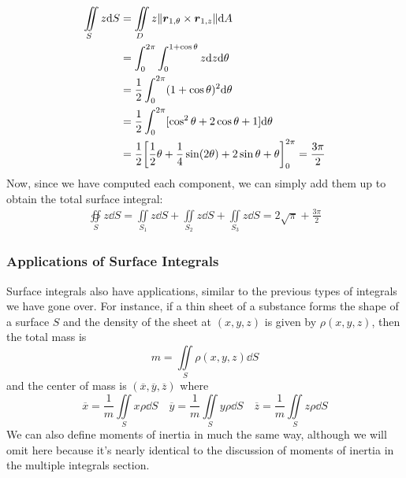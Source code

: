 \begin{example}
\begin{align*}
        \iint\limits_S z\dd S &= \iint\limits_D z\norm{\vec r_{1,\theta}\times\vec r_{1,z}}\dd A \\
        &= \int_0^{2\pi}\int_0^{1+\cos\theta}z\dd z\dd \theta \\
        &= \frac{1}{2}\int_0^{2\pi}(1+\cos\theta)^2\dd \theta \\
        &= \frac{1}{2}\int_0^{2\pi}[\cos^2\theta + 2\cos\theta + 1]\dd \theta \\
        &= \frac{1}{2}\bqty{\frac{1}{2}\theta + \frac{1}{4}\sin(2\theta)+ 2\sin\theta + \theta}_0^{2\pi} = \frac{3\pi}{2} \\
    \end{align*}
    Now, since we have computed each component, we can simply add them up to obtain the total surface integral:
    \begin{align*}
        \oiint\limits_S z\dd S  =\iint\limits_{S_1} z\dd S+\iint\limits_{S_2} z\dd S+\iint\limits_{S_3} z\dd S = 2\sqrt{\pi}+\frac{3\pi}{2}
    \end{align*}
\end{example}
\subsubsection{Applications of Surface Integrals}
Surface integrals also have applications, similar to the previous types of integrals we have gone over. For instance, if a thin sheet of a substance forms the shape of a surface $S$ and the density of the sheet at $(x,y,z)$ is given by $\rho (x,y,z)$, then the total mass is
\[ m = \iint\limits_S \rho(x,y,z)\dd S\]
and the center of mass is $(\overline x, \overline y, \overline z)$ where
\[ \overline x = \frac{1}{m}\iint\limits_S x\rho \dd S \quad \overline y = \frac{1}{m}\iint\limits_S y\rho \dd S \quad \overline z = \frac{1}{m}\iint\limits_S z\rho\dd S\]
We can also define moments of inertia in much the same way, although we will omit here because it's nearly identical to the discussion of moments of inertia in the multiple integrals section.
